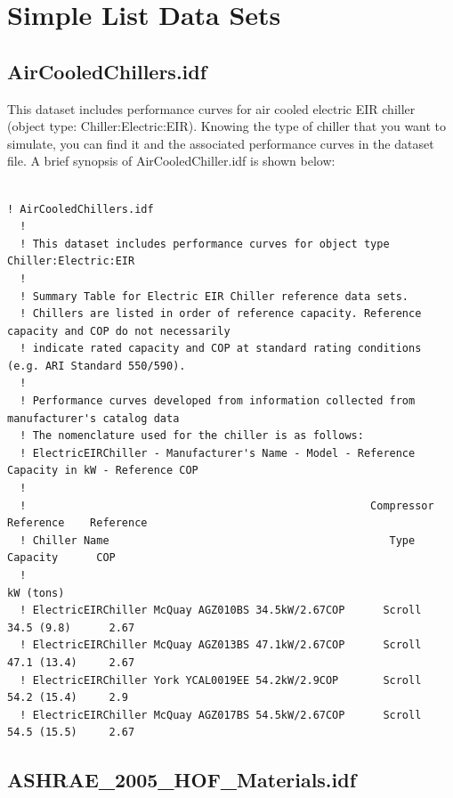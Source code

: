 \section{Simple List Data Sets}\label{simple-list-data-sets}

\subsection{AirCooledChillers.idf}\label{aircooledchillers.idf}

This dataset includes performance curves for air cooled electric EIR chiller (object type: Chiller:Electric:EIR). Knowing the type of chiller that you want to simulate, you can find it and the associated performance curves in the dataset file. A brief synopsis of AirCooledChiller.idf is shown below:

\begin{lstlisting}

! AirCooledChillers.idf
  !
  ! This dataset includes performance curves for object type Chiller:Electric:EIR
  !
  ! Summary Table for Electric EIR Chiller reference data sets.
  ! Chillers are listed in order of reference capacity. Reference capacity and COP do not necessarily
  ! indicate rated capacity and COP at standard rating conditions (e.g. ARI Standard 550/590).
  !
  ! Performance curves developed from information collected from manufacturer's catalog data
  ! The nomenclature used for the chiller is as follows:
  ! ElectricEIRChiller - Manufacturer's Name - Model - Reference Capacity in kW - Reference COP
  !
  !                                                      Compressor   Reference    Reference
  ! Chiller Name                                            Type       Capacity      COP
  !                                                                    kW (tons)
  ! ElectricEIRChiller McQuay AGZ010BS 34.5kW/2.67COP      Scroll     34.5 (9.8)      2.67
  ! ElectricEIRChiller McQuay AGZ013BS 47.1kW/2.67COP      Scroll     47.1 (13.4)     2.67
  ! ElectricEIRChiller York YCAL0019EE 54.2kW/2.9COP       Scroll     54.2 (15.4)     2.9
  ! ElectricEIRChiller McQuay AGZ017BS 54.5kW/2.67COP      Scroll     54.5 (15.5)     2.67
\end{lstlisting}

\subsection{ASHRAE\_2005\_HOF\_Materials.idf}\label{ashraeux5f2005ux5fhofux5fmaterials.idf}

